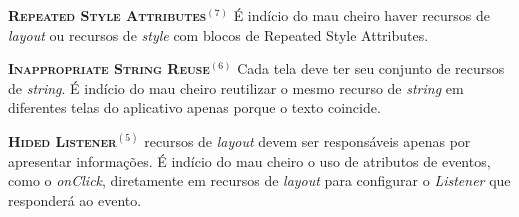 
  \noindent
  \textbf{\textsc{{\small Repeated Style Attributes}}}$^{(7)}$
      É indício do mau cheiro haver recursos de \textit{layout} ou recursos de \textit{style} com blocos de Repeated Style Attributes.


  \noindent
  \textbf{\textsc{{\small Inappropriate String Reuse}}}$^{(6)}$
      Cada tela deve ter seu conjunto de recursos de \textit{string}. É indício do mau cheiro reutilizar o mesmo recurso de \textit{string} em diferentes telas do aplicativo apenas porque o texto coincide.


  \noindent
  \textbf{\textsc{{\small Hided Listener}}}$^{(5)}$
      recursos de \textit{layout} devem ser responsáveis apenas por apresentar informações. É indício do mau cheiro o uso de atributos de eventos, como o \textit{onClick}, diretamente em recursos de \textit{layout} para configurar o \textit{Listener} que responderá ao evento. \\

